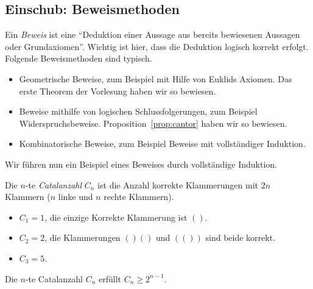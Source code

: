 \documentclass[../main.tex]{subfiles}
\begin{document}
\subsection*{Einschub: Beweismethoden}
Ein \textit{Beweis} ist eine ``Deduktion einer Aussage
aus bereits bewiesenen Aussagen oder Grundaxiomen''.
Wichtig ist hier, dass die Deduktion logisch korrekt erfolgt.
Folgende Beweismethoden sind typisch.
  \begin{itemize}
    \item Geometrische Beweise, zum Beispiel mit Hilfe von Euklids Axiomen.
      Das erste Theorem der Vorlesung haben wir so bewiesen.
    \item Beweise mithilfe von logischen Schlussfolgerungen,
      zum Beispiel Widerspruchsbeweise.
      Proposition~\ref{prop:cantor} haben wir so bewiesen.
    \item Kombinatorische Beweise, zum Beispiel
      Beweise mit vollständiger Induktion.
  \end{itemize}


Wir führen nun ein Beispiel eines Beweises durch vollständige Induktion.
\begin{definition}
  Die $n$-te \textit{Catalanzahl} $C_{n}$ ist die Anzahl korrekte
  Klammerungen mit $2n$ Klammern ($n$ linke und $n$ rechte Klammern).
\end{definition}

\begin{examples}
  \leavevmode
  \begin{itemize}
    \item
        $C_{1} = 1$, die einzige Korrekte Klammerung ist $()$.
    \item
      $C_{2} = 2$, die Klammerungen $()()$ und $(())$ sind beide korrekt.
    \item $C_{3} = 5$.
  \end{itemize}
\end{examples}

\begin{claim}
  Die $n$-te Catalanzahl $C_{n}$ erfüllt $C_{n} \geq 2^{n-1}$.
\end{claim}
\end{document}
